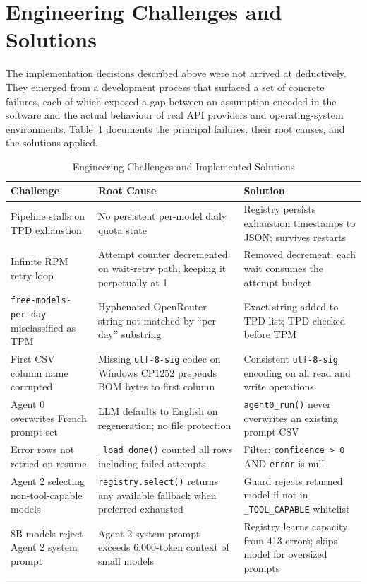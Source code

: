 \section{Engineering Challenges and Solutions}
\label{sec:challenges}

The implementation decisions described above were not arrived at deductively.
They emerged from a development process that surfaced a set of concrete failures,
each of which exposed a gap between an assumption encoded in the software and the
actual behaviour of real API providers and operating-system environments.
Table~\ref{tab:challenges} documents the principal failures, their root causes,
and the solutions applied.

\begin{table}[H]
\centering
\caption{Engineering Challenges and Implemented Solutions}
\label{tab:challenges}
\begin{tabular}{|p{4cm}|p{4.6cm}|p{4.6cm}|}
\hline
\textbf{Challenge} & \textbf{Root Cause} & \textbf{Solution} \\
\hline
Pipeline stalls on TPD exhaustion & No persistent per-model daily quota state & Registry persists exhaustion timestamps to JSON; survives restarts \\
\hline
Infinite RPM retry loop & Attempt counter decremented on wait-retry path, keeping it perpetually at 1 & Removed decrement; each wait consumes the attempt budget \\
\hline
\texttt{free-models-per-day} misclassified as TPM & Hyphenated OpenRouter string not matched by ``per day'' substring & Exact string added to TPD list; TPD checked before TPM \\
\hline
First CSV column name corrupted & Missing \texttt{utf-8-sig} codec on Windows CP1252 prepends BOM bytes to first column & Consistent \texttt{utf-8-sig} encoding on all read and write operations \\
\hline
Agent 0 overwrites French prompt set & LLM defaults to English on regeneration; no file protection & \texttt{agent0\_run()} never overwrites an existing prompt CSV \\
\hline
Error rows not retried on resume & \texttt{\_load\_done()} counted all rows including failed attempts & Filter: \texttt{confidence > 0} AND \texttt{error} is null \\
\hline
Agent 2 selecting non-tool-capable models & \texttt{registry.select()} returns any available fallback when preferred exhausted & Guard rejects returned model if not in \texttt{\_TOOL\_CAPABLE} whitelist \\
\hline
8B models reject Agent 2 system prompt & Agent 2 system prompt exceeds 6,000-token context of small models & Registry learns capacity from 413 errors; skips model for oversized prompts \\
\hline
\end{tabular}
\end{table}

